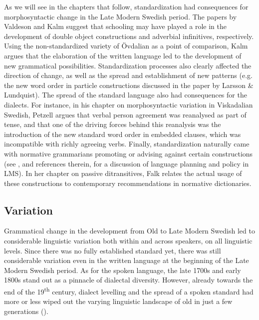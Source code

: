 \documentclass[output=paper]{langscibook}
\begin{document}
As we will see in the chapters that follow, standardization had consequences for morphosyntactic change in the Late Modern Swedish period. The papers by Valdeson and Kalm suggest that schooling may have played a role in the development of double object constructions and adverbial infinitives, respectively. Using the non-standardized variety of Övdalian as a point of comparison, Kalm argues that the elaboration of the written language led to the development of new grammatical possibilities. Standardization processes also clearly affected the direction of change, as well as the spread and establishment of new patterns (e.g. the new word order in particle constructions discussed in the paper by Larsson \& Lundquist). The spread of the standard language also had consequences for the dialects. For instance, in his chapter on morphosyntactic variation in Viskadalian Swedish, Petzell argues that verbal person agreement was reanalysed as part of tense, and that one of the driving forces behind this reanalysis was the introduction of the new standard word order in embedded clauses, which was incompatible with richly agreeing verbs. Finally, standardization naturally came with normative grammarians promoting or advising against certain constructions (see \citealt{Teleman2002, Teleman2003Tradis, Teleman2002}, and references therein, for a discussion of language planning and policy in LMS). In her chapter on passive ditransitives, Falk relates the actual usage of these constructions to contemporary recommendations in normative dictionaries. 


\subsection{Variation}\label{sec:intro:2.2}


Grammatical change in the development from Old to Late Modern Swedish led to considerable linguistic variation both within and across speakers, on all linguistic levels. Since there was no fully established standard yet, there was still considerable variation even in the written language at the beginning of the Late Modern Swedish period. As for the spoken language, the late 1700s and early 1800s stand out as a pinnacle of dialectal diversity. However, already towards the end of the 19\textsuperscript{th} century, dialect levelling and the spread of a spoken standard had more or less wiped out the varying linguistic landscape of old in just a few generations (\citealt{NilssonPetzell2015}).
\end{document}
